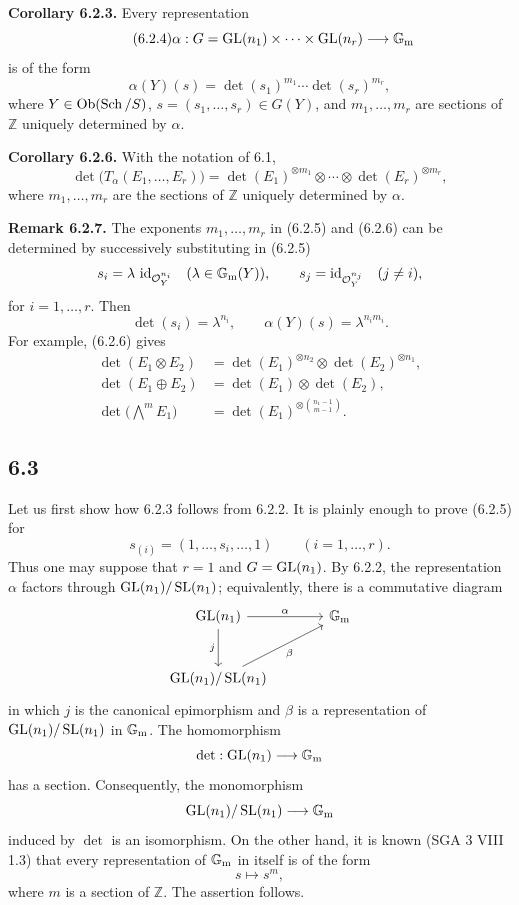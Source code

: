 \textbf{Corollary 6.2.3.}
Every representation
\begin{equation}\tag{6.2.4}
\alpha:G=\operatorname{GL}(n_1)\times\cdots\times\operatorname{GL}(n_r)\longrightarrow\mathbb G_{\mathrm m}
\end{equation}
is of the form
\begin{equation}\tag{6.2.5}
\alpha(Y)(s)=\det(s_1)^{m_1}\cdots\det(s_r)^{m_r},
\end{equation}
where $Y\in\operatorname{Ob}(\operatorname{Sch}/S)$, $s=(s_1,\ldots,s_r)\in G(Y)$, and
$m_1,\ldots,m_r$ are sections of $\mathbb Z$ uniquely determined by
$\alpha$.

\textbf{Corollary 6.2.6.}
With the notation of 6.1,
\begin{equation}\tag{6.2.6}
\det\bigl(T_\alpha(E_1,\ldots,E_r)\bigr)
=\det(E_1)^{\otimes m_1}\otimes\cdots\otimes
\det(E_r)^{\otimes m_r},
\end{equation}
where $m_1,\ldots,m_r$ are the sections of $\mathbb Z$ uniquely determined
by $\alpha$.

\textbf{Remark 6.2.7.}
The exponents $m_1,\ldots,m_r$ in (6.2.5) and (6.2.6) can be determined by
successively substituting in (6.2.5)
\[
s_i=\lambda\,\operatorname{id}_{\mathcal O_Y^{n_i}}\quad(\lambda\in\mathbb G_{\mathrm m}(Y)),
\qquad
s_j=\operatorname{id}_{\mathcal O_Y^{n_j}}\quad(j\ne i),
\]
for $i=1,\ldots,r$. Then
\[
\det(s_i)=\lambda^{n_i},
\qquad
\alpha(Y)(s)=\lambda^{n_i m_i}.
\]
For example, (6.2.6) gives
\begin{align}
\det(E_1\otimes E_2)
&=\det(E_1)^{\otimes n_2}\otimes\det(E_2)^{\otimes n_1},
\tag{6.2.8}\\
\det(E_1\oplus E_2)
&=\det(E_1)\otimes\det(E_2),
\tag{6.2.9}\\
\det\bigl(\bigwedge\nolimits^m E_1\bigr)
&=\det(E_1)^{\otimes\binom{n_1-1}{m-1}}.
\tag{6.2.10}
\end{align}

\subsection*{6.3}
Let us first show how 6.2.3 follows from 6.2.2. It is plainly enough to prove
(6.2.5) for
\[
s_{(i)}=(1,\ldots,s_i,\ldots,1)\qquad(i=1,\ldots,r).
\]
Thus one may suppose that $r=1$ and $G=\operatorname{GL}(n_1)$. By 6.2.2, the
representation $\alpha$ factors through $\operatorname{GL}(n_1)/\operatorname{SL}(n_1)$; equivalently,
there is a commutative diagram
\[
\begin{tikzcd}[column sep=large,row sep=large]
\GL(n_1) \arrow[r,"\alpha"] \arrow[d,"j"'] & \Gm\\
\GL(n_1)/\SL(n_1) \arrow[ur,"\beta"'] &
\end{tikzcd}
\]
in which $j$ is the canonical epimorphism and $\beta$ is a representation
of $\operatorname{GL}(n_1)/\operatorname{SL}(n_1)$ in $\mathbb G_{\mathrm m}$. The homomorphism
\[
\det:\operatorname{GL}(n_1)\longrightarrow\mathbb G_{\mathrm m}
\]
has a section. Consequently, the monomorphism
\[
\operatorname{GL}(n_1)/\operatorname{SL}(n_1)\longrightarrow\mathbb G_{\mathrm m}
\]
induced by $\det$ is an isomorphism. On the other hand, it is known
(SGA 3 VIII 1.3) that every representation of $\mathbb G_{\mathrm m}$ in itself is of the
form
\[
s\longmapsto s^m,
\]
where $m$ is a section of $\mathbb Z$. The assertion follows.

